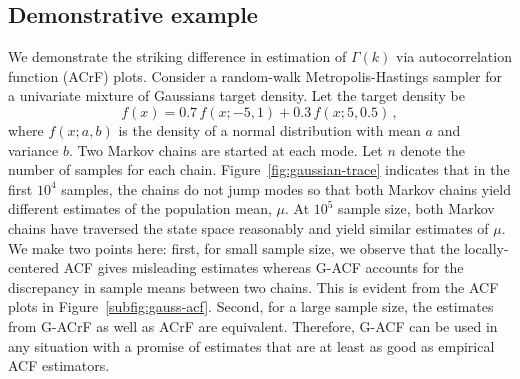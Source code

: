 \documentclass[11pt]{article}
\theoremstyle{remark}
\newtheorem{example}{Example}
\begin{document}

\subsection{Demonstrative example} %
\label{sub:demonstrative_example}


We demonstrate the striking difference in estimation of $\Gamma(k)$ via autocorrelation function (ACrF) plots. Consider a random-walk Metropolis-Hastings sampler for a univariate mixture of Gaussians target density. Let the target density be 
\[
f(x) = 0.7\,f(x; -5, 1) + 0.3\,f(x; 5, 0.5)\,,
\]
where $f(x; a,b)$ is the density of a normal distribution with mean $a$ and variance $b$. 
Two Markov chains are started at each mode. Let $n$ denote the number of samples for each chain. Figure~\ref{fig:gaussian-trace} indicates that in the first $10^4$ samples, the chains do not jump modes so that both Markov chains yield different estimates of the population mean, $\mu$. At $10^5$ sample size, both Markov chains have traversed the state space reasonably and yield similar estimates of $\mu$. We make two points here: first, for small sample size, we observe that the locally-centered ACF gives misleading estimates whereas G-ACF accounts for the discrepancy in sample means between two chains. This is evident from the ACF plots  in Figure~\ref{subfig:gauss-acf}. Second, for a large sample size, the estimates from G-ACrF as well as ACrF are equivalent. Therefore, G-ACF can be used in any situation with a promise of estimates that are at least as good as empirical ACF estimators.  
\end{document}
